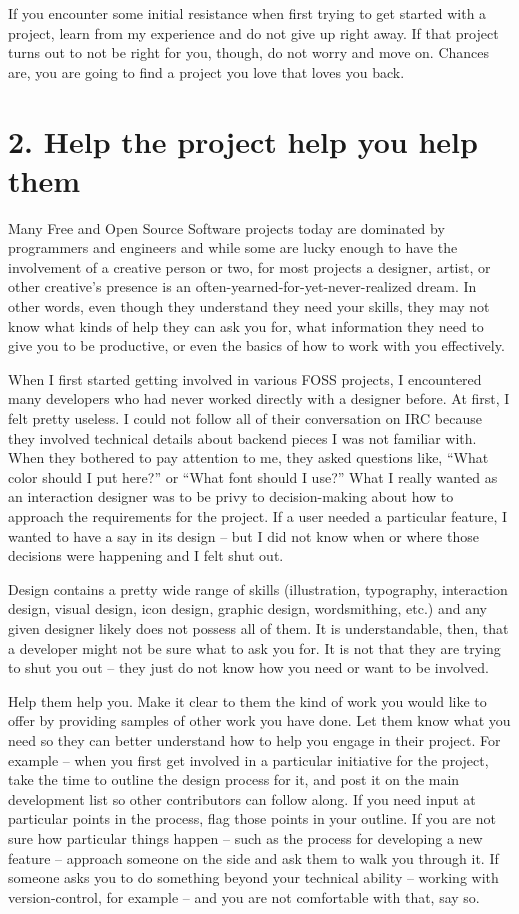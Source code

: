 If you encounter some initial resistance when first trying to get started with a
project, learn from my experience and do not give up right away. If that project
turns out to not be right for you, though, do not worry and move on. Chances are,
you are going to find a project you love that loves you back.

\section*{2. Help the project help you help them}

Many Free and Open Source Software projects today are dominated by programmers and
engineers and while some are lucky enough to have the involvement of a creative
person or two, for most projects a designer, artist, or other creative's
presence is an often-yearned-for-yet-never-realized dream. In other words, even
though they understand they need your skills, they may not know what kinds of
help they can ask you for, what information they need to give you to be
productive, or even the basics of how to work with you effectively. 

When I first started getting involved in various FOSS projects, I encountered
many developers who had never worked directly with a designer before. At first,
I felt pretty useless. I could not follow all of their conversation on IRC
because they involved technical details about backend pieces I was not familiar
with. When they bothered to pay attention to me, they asked questions like,
``What color should I put here?'' or ``What font should I use?'' What I really
wanted as an interaction designer was to be privy to decision-making about how
to approach the requirements for the project. If a user needed a particular
feature, I wanted to have a say in its design -- but I did not know when or where those decisions were happening and I felt shut out.

Design contains a pretty wide range of skills (illustration, typography,
interaction design, visual design, icon design, graphic design, wordsmithing,
etc.) and any given designer likely does not possess all of them. It is
understandable, then, that a developer might not be sure what to ask you for.
It is not that they are trying to shut you out -- they just do not know how you
need or want to be involved.

Help them help you. Make it clear to them the kind of work you would like to offer by providing samples of other work you have done. Let them know what you need so they can better understand how to help you engage in their project. For example -- when you first get involved in a particular initiative for the project, take the time to outline the design process for it, and post it on the main development list so other contributors can follow along. If you need input at particular points in the process, flag those points in your outline. If you are not sure how particular things happen -- such as the process for developing a new feature -- approach someone on the side and ask them to walk you through it. If someone asks you to do something beyond your technical ability -- working with version-control, for example -- and you are not comfortable with that, say so.

